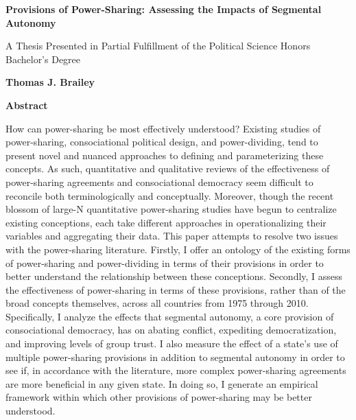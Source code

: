 \documentclass[12pt]{article}
\begin{document}
\begin{titlepage}

\begin{center}
\vspace{1cm}
\LARGE
\textbf{Provisions of Power-Sharing: Assessing the Impacts of Segmental Autonomy}

\large
\vspace{.5cm}

A Thesis Presented in Partial Fulfillment of the Political Science Honors Bachelor's Degree\\

\vspace{.5cm}

\textbf{Thomas J. Brailey}\\

\vspace{.5cm}
\Large
\vspace{.5cm}
\Large

\textbf{Abstract}
\end{center}
How can power-sharing be most effectively understood? Existing studies of power-sharing, consociational political design, and power-dividing, tend to present novel and nuanced approaches to defining and parameterizing these concepts. As such, quantitative and qualitative reviews of the effectiveness of power-sharing agreements and consociational democracy seem difficult to reconcile both terminologically and conceptually. Moreover, though the recent blossom of large-N quantitative power-sharing studies have begun to centralize existing conceptions, each take different approaches in operationalizing their variables and aggregating their data. This paper attempts to resolve two issues with the power-sharing literature. Firstly, I offer an ontology of the existing forms of power-sharing and power-dividing in terms of their provisions in order to better understand the relationship between these conceptions. Secondly, I assess the effectiveness of power-sharing in terms of these provisions, rather than of the broad concepts themselves, across all countries from 1975 through 2010. Specifically, I analyze the effects that segmental autonomy, a core provision of consociational democracy, has on abating conflict, expediting democratization, and improving levels of group trust. I also measure the effect of a state's use of multiple power-sharing provisions in addition to segmental autonomy in order to see if, in accordance with the literature, more complex power-sharing agreements are more beneficial in any given state. In doing so, I generate an empirical framework within which other provisions of power-sharing may be better understood.


\end{titlepage}
\end{document}
